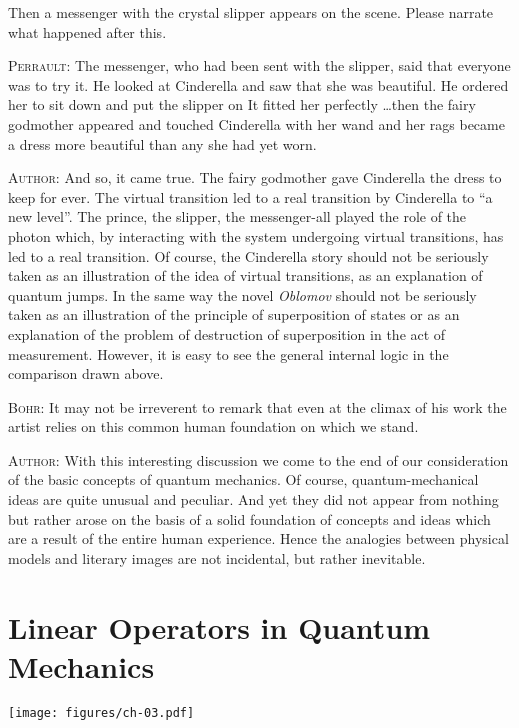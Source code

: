 \documentclass[a4paper,sfsidenotes,colorlinks=true]{tufte-book}
\numberwithin{equation}{section}
\numberwithin{figure}{section}
\begin{document}
Then a messenger with the crystal slipper appears on the scene. Please
narrate what happened after this.


\textsc{Perrault:} The messenger, who had been sent with the slipper,
said that everyone was to try it. He looked at Cinderella and saw that
she was beautiful. He ordered her to sit down and put the slipper on
It fitted her perfectly \ldots then the fairy godmother appeared and
touched Cinderella with her wand and her rags became a dress more
beautiful than any she had yet worn.


\textsc{Author:} And so, it came true. The fairy godmother gave
Cinderella the dress to keep for ever. The virtual transition led to a
real transition by Cinderella to ``a new level''. The prince, the
slipper, the messenger-all played the role of the photon which, by
interacting with the system undergoing virtual transitions, has led to
a real transition. Of course, the Cinderella story should not be
seriously taken as an illustration of the idea of virtual transitions,
as an explanation of quantum jumps. In the same way the novel \emph{Oblomov}
should not be seriously taken as an illustration of the principle of
superposition of states or as an explanation of the problem of
destruction of superposition in the act of measurement. However, it is
easy to see the general internal logic in the comparison drawn above.


\textsc{Bohr:} It may not be irreverent to remark that even at the
climax of his work the artist relies on this common human foundation
on which we stand.


\textsc{Author:} With this interesting discussion we come to the end of our
consideration of the basic concepts of quantum mechanics. Of course,
quantum-mechanical ideas are quite unusual and peculiar. And yet they
did not appear from nothing but rather arose on the basis of a solid
foundation of concepts and ideas which are a result of the entire
human experience. Hence the analogies between physical models and
literary images are not incidental, but rather inevitable.
\cleardoublepage

\chapter{Linear Operators in Quantum Mechanics}

\begin{figure*}%
\centering
\texttt{[image: figures/ch-03.pdf]}
\end{figure*}
\cleardoublepage
\end{document}
